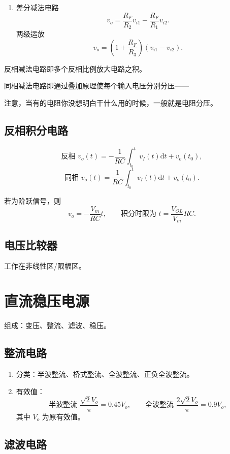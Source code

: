\documentclass[UTF8,fontset=fandol,zihao=5]{ctexart}
\newcommand{\dd}{\mathrm{d}}
\begin{document}
{\begin{enumerate}
  \item 差分减法电路
  \[
    v_o=\frac{R_F}{R_2}v_{i1}-\frac{R_F}{R_1}v_{i2}.
  \]
  两级运放
  \[
    v_o=\left(1+\frac{R_F}{R_3}\right)(v_{i1}-v_{i2}).
  \]
\end{enumerate}

反相减法电路即多个反相比例放大电路之积。

同相减法电路即通过叠加原理使每个输入电压分别分压——

注意，当有的电阻你没想明白干什么用的时候，一般就是电阻分压。

\subsection{反相积分电路}

\[
  \text{反相 }v_o(t)=-\frac1{RC}\int_{t_0}^t v_I(t)\dd t+v_o(t_0),
\]
\[
  \text{同相 }v_o(t)=\frac1{RC}\int_{t_0}^t v_I(t)\dd t+v_o(t_0).
\]

若为阶跃信号，则
\[
  v_o=-\frac{V_m}{RC}t,
  \qquad
  \text{积分时限为 }t=\frac{V_{OL}}{V_m}RC.
\]

\subsection{电压比较器}

工作在非线性区/限幅区。

\section{直流稳压电源}

组成：变压、整流、滤波、稳压。

\subsection{整流电路}

\begin{enumerate}
  \item 分类：半波整流、桥式整流、全波整流、正负全波整流。
  \item 有效值：
  \[
    \text{半波整流 }\frac{\sqrt2V_o}{\pi}=0.45V_o,
    \qquad
    \text{全波整流 }\frac{2\sqrt2V_o}{\pi}=0.9V_o,
  \]
  其中 $V_o$ 为原有效值。
\end{enumerate}

\subsection{滤波电路}

}
\end{document}
